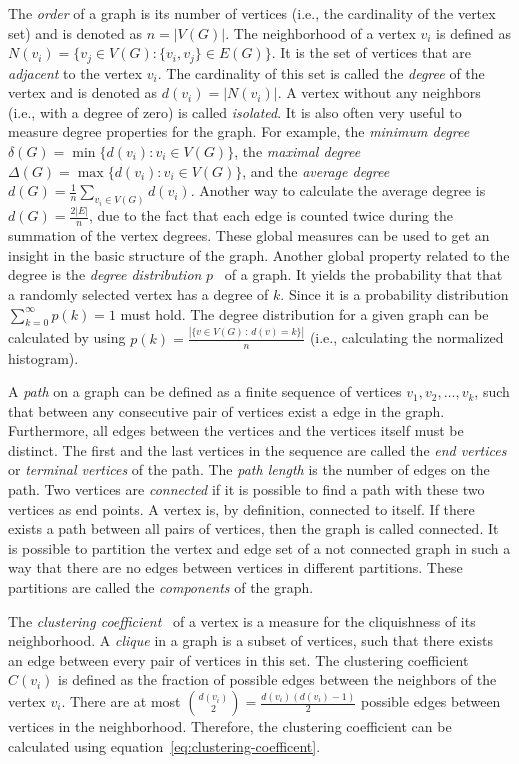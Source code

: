 The \emph{order} of a graph is its number of vertices (i.e., the cardinality of the vertex set) and is denoted as \(n = |V(G)|\).
The neighborhood of a vertex \(v_i\) is defined as \(N(v_i) = \{v_j \in V(G) : \{v_i, v_j \} \in E(G)\}\).
It is the set of vertices that are \emph{adjacent} to the vertex \(v_i\).
The cardinality of this set is called the \emph{degree} of the vertex and is denoted as \(d(v_i) = |N(v_i)|\).
A vertex without any neighbors (i.e., with a degree of zero) is called \emph{isolated}.
It is also often very useful to measure degree properties for the graph.
For example, the \emph{minimum degree} \(\delta(G) = \min\{d(v_i) : v_i \in V(G)\}\), the \emph{maximal degree} \(\Delta(G) = \max\{d(v_i) : v_i \in V(G)\}\), and the \emph{average degree} \(d(G) = \frac{1}{n} \sum_{v_i \in V(G)} d(v_i)\).
Another way to calculate the average degree is \(d(G) = \frac{2|E|}{n}\), due to the fact that each edge is counted twice during the summation of the vertex degrees.
These global measures can be used to get an insight in the basic structure of the graph.
Another global property related to the degree is the \emph{degree distribution} \(p\)~\cite{Barabasi2016} of a graph.
It yields the probability that that a randomly selected vertex has a degree of \(k\).
Since it is a probability distribution \(\sum_{k=0}^\infty p(k) = 1\) must hold.
The degree distribution for a given graph can be calculated by using \(p(k) = \frac{|\{v \in V(G) \,:\, d(v) = k\}|}{n}\) (i.e., calculating the normalized histogram).

A \emph{path} on a graph can be defined as a finite sequence of vertices \(v_1,v_2,\dots,v_k\), such that between any consecutive pair of vertices exist a edge in the graph.
Furthermore, all edges between the vertices and the vertices itself must be distinct.
The first and the last vertices in the sequence are called the \emph{end vertices} or \emph{terminal vertices} of the path.
The \emph{path length} is the number of edges on the path.
Two vertices are \emph{connected} if it is possible to find a path with these two vertices as end points.
A vertex is, by definition, connected to itself.
If there exists a path between all pairs of vertices, then the graph is called connected.
It is possible to partition the vertex and edge set of a not connected graph in such a way that there are no edges between vertices in different partitions.
These partitions are called the \emph{components} of the graph.

The \emph{clustering coefficient}~\cite{Watts1998} of a vertex is a measure for the cliquishness of its neighborhood.
A \emph{clique} in a graph is a subset of vertices, such that there exists an edge between every pair of vertices in this set.
The clustering coefficient \(C(v_i)\) is defined as the fraction of possible edges between the neighbors of the vertex \(v_i\).
There are at most \(\binom{d(v_i)}{2} = \frac{d(v_i)(d(v_i) - 1)}{2}\) possible edges between vertices in the neighborhood.
Therefore, the clustering coefficient can be calculated using equation~\ref{eq:clustering-coefficent}.

